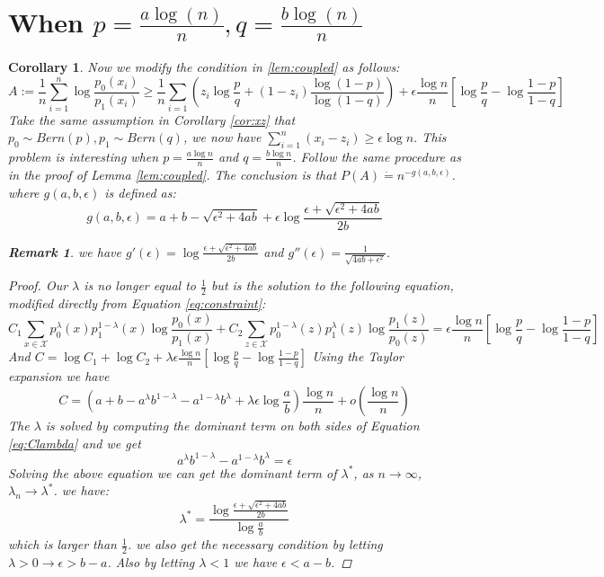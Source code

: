 \documentclass{article}
\newtheorem{remark}{Remark}
\newtheorem{corollary}{Corollary}
\newcommand{\A}{\frac{a \log(n)}{n}}
\newcommand{\B}{\frac{b \log(n)}{n}}
\begin{document}
\section{When $p=\A, q=\B$}
\begin{corollary}\label{cor:decrease}
	Now we modify the condition in \ref{lem:coupled} as follows:
	$$
	A := \frac{1}{n}\sum_{i=1}^n \log \frac{p_0(x_i)}{p_1(x_i)} \geq \frac{1}{n} \sum_{i=1}(z_i \log\frac{p}{q} +(1-z_i) \frac{\log(1-p)}{\log(1-q)}) + \epsilon\frac{\log n }{n} [\log \frac{p}{q} - \log \frac{1-p}{1-q}]
	$$
	Take the same assumption in Corollary \ref{cor:xz} that
	$p_0 \sim Bern(p), p_1 \sim Bern(q)$, we now have $\sum_{i=1}^n (x_i - z_i) \geq \epsilon \log n$.
	This problem is interesting when
	$ p = \frac{a \log n }{n} $ and $ q = \frac{b \log n }{n}$. Follow the same procedure as
	in the proof of Lemma \ref{lem:coupled}. The conclusion is that $P(A) \dot{=} n^{-g(a,b,\epsilon)}$.
	where $g(a,b,\epsilon)$ is defined as:
	\begin{equation}\label{eq:gab}
	g(a,b,\epsilon) = a + b - \sqrt{\epsilon^2 + 4ab} + \epsilon \log \frac{\epsilon + \sqrt{\epsilon^2 + 4ab}}{2b}
	\end{equation}
	\begin{remark}
		we have $g'(\epsilon) = \log \frac{\epsilon + \sqrt{\epsilon^2 + 4ab}}{2b}$ and $g''(\epsilon ) = \frac{1}{\sqrt{4ab + \epsilon^2}}$.
		\end{remark}
	\begin{proof}
	Our $\lambda$ is no longer equal to $\frac{1}{2}$ but is the solution to the following equation, modified directly from Equation \eqref{eq:constraint}:
	\begin{equation}\label{eq:Clambda}
	C_1 \sum_{x\in \mathcal{X}} p_0^{\lambda}(x)p_1^{1-\lambda}(x)\log\frac{p_0(x)}{p_1(x)} + C_2 \sum_{z\in \mathcal{X}} p_0^{1-\lambda}(z)p_1^{\lambda}(z)\log\frac{p_1(z)}{p_0(z)}= \epsilon\frac{\log n }{n} [\log \frac{p}{q} - \log \frac{1-p}{1-q}]
	\end{equation}
	And $C= \log C_1 + \log C_2 + \lambda \epsilon\frac{\log n }{n} [\log \frac{p}{q} - \log \frac{1-p}{1-q}]$
	Using the Taylor expansion we have
	$$
	C = (a + b - a^{\lambda}b^{1-\lambda} - a^{1-\lambda}b^{\lambda} + \lambda \epsilon \log\frac{a}{b}) \frac{\log n }{n}
	+ o(\frac{\log n}{n})
	$$
	The $\lambda$ is solved by computing the dominant term on both sides of Equation \eqref{eq:Clambda} and we get
	\begin{equation}
	 a^{\lambda}b^{1-\lambda} - a^{1-\lambda}b^{\lambda} = \epsilon
	\end{equation}
	Solving the above equation we can get the dominant term of $\lambda^*$, as $n\to \infty$, $\lambda_n \to \lambda^*$.
	we have:
	\begin{equation}
	\lambda^*= \frac{
				\log \frac{ 
			\epsilon + \sqrt{\epsilon^2 + 4 ab }	
			} { 2b}
	}
	{\log \frac{a}{b}}
	\end{equation}
	which is larger than $\frac{1}{2}$. we also get the necessary condition by letting $\lambda > 0 \rightarrow \epsilon > b - a$.  Also by letting $\lambda < 1$ we have $\epsilon < a - b$.
	\end{proof}
\end{corollary}
\end{document}
